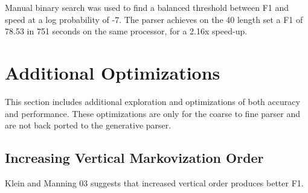 \documentclass[11pt]{article}
\begin{document}
Manual binary search was used to find a balanced threshold between F1 and speed at a log
probability of -7.
The parser achieves on the 40 length set a F1 of 78.53 in 751 seconds on the same processor,
for a 2.16x speed-up.

\section{Additional Optimizations}
This section includes additional exploration and optimizations of both accuracy and performance.
These optimizations are only for the coarse to fine parser and are not back ported to the
generative parser.

\subsection{Increasing Vertical Markovization Order}
Klein and Manning 03 suggests that increased vertical order produces better F1.
\end{document}
